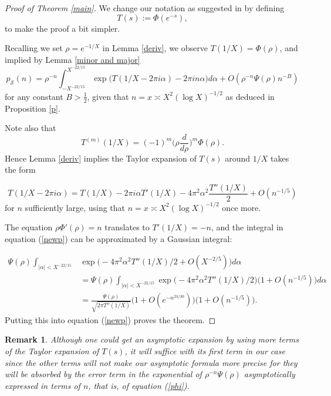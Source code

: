\documentclass[12pt,reqno]{amsart}
\newtheorem*{remark}{Remark}
\begin{document}
\begin{proof}[Proof of Theorem \ref{main}]
We change our notation as suggested in \cite{dt} by defining
\begin{equation*}
    T(s):=\Phi(e^{-s}),
\end{equation*}
to make the proof a bit simpler.

Recalling we set $\rho=e^{-1/X}$ in Lemma \ref{deriv}, we observe $T(1/X)=\Phi(\rho)$, and implied by Lemma \ref{minor and major} 
\begin{equation}\label{newp}
    p_\mathcal{S}(n) = \rho^{-n} \int_{-X^{-22/15}}^{X^{-22/15}} \exp\big(T(1/X-2\pi i \alpha)-2\pi in\alpha\big)  d\alpha+O(\rho^{-n}\Psi(\rho)n^{-B})
\end{equation}
for any constant $B>\frac{1}{2}$, given that $n=x\asymp X^2(\log X)^{-1/2}$ as deduced in Proposition \ref{p}.

Note also that
\begin{equation*}
    T^{(m)}(1/X)= (-1)^m \Big(\rho\frac{d}{d\rho}\Big)^m \Phi(\rho).
\end{equation*}
Hence Lemma \ref{deriv} implies the Taylor expansion of $T(s)$ around $1/X$ takes the form

\begin{equation*}
    T(1/X-2\pi i\alpha)= T(1/X)-2\pi i\alpha T'(1/X)-4\pi^2\alpha^2\frac{T''(1/X)}{2}+O(n^{-1/5})
\end{equation*}
 for $n$ sufficiently large, using that  $n=x\asymp X^2(\log X)^{-1/2}$ once more.


The equation $\rho\Phi'(\rho)=n$ translates to $T'(1/X)=-n$, and the integral in equation (\ref{newp}) can be approximated by a Gaussian integral:

\begin{align*}
    \Psi(\rho) \int_{|\alpha|<X^{-22/15}}& \exp\big(-4\pi^2\alpha^2T''(1/X)/2+O(X^{-2/5})\big) d\alpha\\
    &=\Psi(\rho)\int_{|\alpha|<X^{-22/15}} \exp\big(-4\pi^2\alpha^2T''(1/X)/2\big)\Big(1+O(n^{-1/5})\Big) d\alpha\\
    & = \frac{\Psi(\rho)}{\sqrt{2\pi T''(1/X)}}\Big(1+O(e^{-n^{23/30}})\Big)\Big(1+O(n^{-1/5})\Big).
\end{align*}
Putting this into equation (\ref{newp}) proves the theorem.
\end{proof}

\begin{remark}
    Although one could get an asymptotic expansion  by using more terms of the Taylor expansion of $T(s)$, it will suffice with its first term in our case since the other terms will not make our asymptotic formula more precise for they will be absorbed by the error term in the exponential of $\rho^{-n}\Psi(\rho)$ asymptotically expressed in terms of $n$, that is, of equation (\ref{phi}).
\end{remark}
\end{document}
